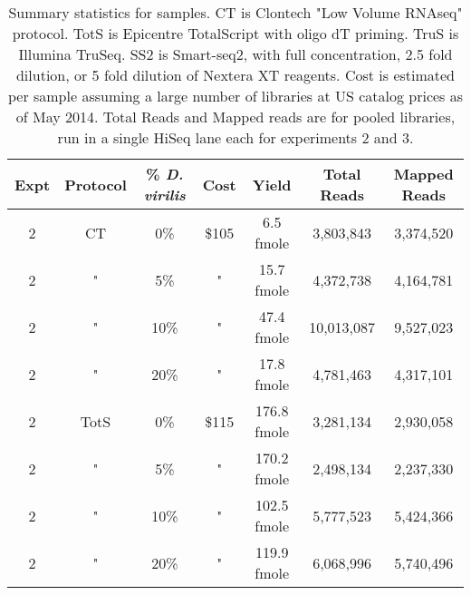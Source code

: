 

\begin{table}[htdp]

\caption{Summary statistics for samples. CT is Clontech "Low Volume RNAseq" protocol. TotS is Epicentre TotalScript with oligo dT priming. TruS is Illumina TruSeq. SS2 is Smart-seq2, with full concentration, 2.5 fold dilution, or 5 fold dilution of Nextera XT reagents. Cost is estimated per sample assuming a
     large number of libraries at US catalog prices as of May 2014. Total Reads
     and Mapped reads are for pooled libraries, run in a single HiSeq lane each
     for experiments 2 and 3. }
\begin{center}
\begin{tabular}{|c|c|c|c|c|c|c|} \hline
      Expt & Protocol & \% {\em D. virilis} & Cost &  Yield & Total Reads & Mapped Reads \\\hline 
2 & CT & 0\% & \$105 & 6.5 fmole & 3,803,843 &3,374,520 \\
2 & " & 5\% & " & 15.7 fmole & 4,372,738 &4,164,781 \\
2 & " & 10\% & " & 47.4 fmole & 10,013,087 &9,527,023 \\
2 & " & 20\% & " & 17.8 fmole & 4,781,463 &4,317,101 \\
2 & TotS & 0\% & \$115 & 176.8 fmole & 3,281,134 &2,930,058 \\
2 & " & 5\% & " & 170.2 fmole & 2,498,134 &2,237,330 \\
2 & " & 10\% & " & 102.5 fmole & 5,777,523 &5,424,366 \\
2 & " & 20\% & " & 119.9 fmole & 6,068,996 &5,740,496 \\

\end{tabular}
\end{center}
\end{table}
